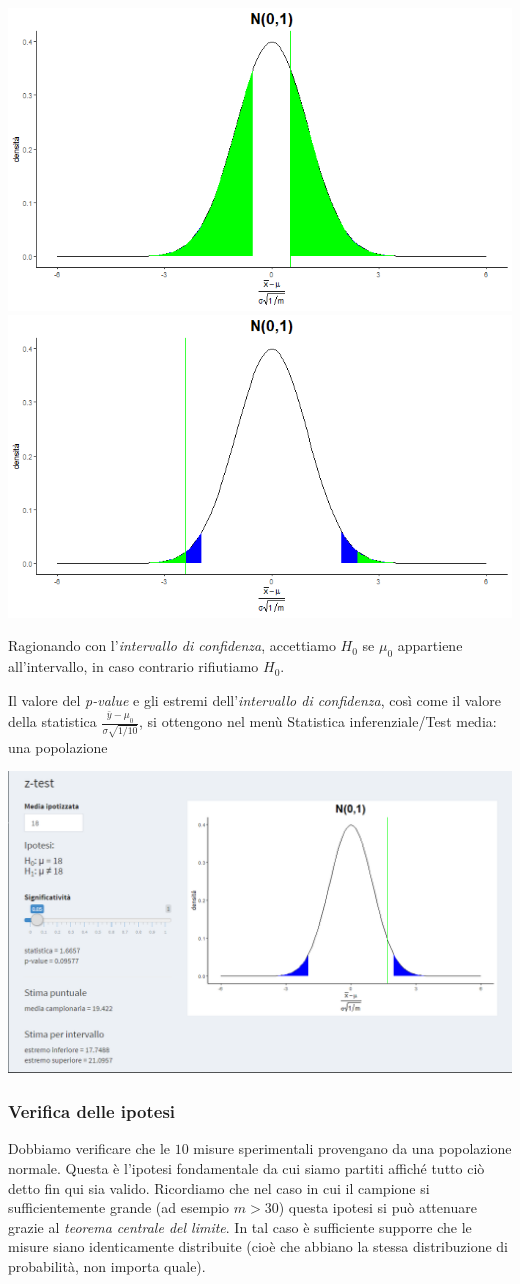 \documentclass[
  11pt,
]{book}
\begin{document}
\includegraphics[width=0.5\linewidth]{Immagini/Inferenziale/pval}
\includegraphics[width=0.5\linewidth]{Immagini/Inferenziale/pval1}

Ragionando con l'\emph{intervallo di confidenza}, accettiamo \(H_0\) se \(\mu_0\) appartiene all'intervallo, in caso contrario rifiutiamo \(H_0\).

Il valore del \emph{p-value} e gli estremi dell'\emph{intervallo di confidenza}, così come il valore della statistica \(\frac{\bar{y}-\mu_0}{\sigma\sqrt{1/10}}\), si ottengono nel menù Statistica inferenziale/Test media: una popolazione

\begin{center}\includegraphics[width=0.5\linewidth]{Immagini/Inferenziale/test_ip4} \end{center}

\hypertarget{verifica-delle-ipotesi}{%
\subsubsection{Verifica delle ipotesi}\label{verifica-delle-ipotesi}}

Dobbiamo verificare che le \(10\) misure sperimentali provengano da una popolazione normale. Questa è l'ipotesi fondamentale da cui siamo partiti affiché tutto ciò detto fin qui sia valido. Ricordiamo che nel caso in cui il campione si sufficientemente grande (ad esempio \(m>30\)) questa ipotesi si può attenuare grazie al \emph{teorema centrale del limite}. In tal caso è sufficiente supporre che le misure siano identicamente distribuite (cioè che abbiano la stessa distribuzione di probabilità, non importa quale).
\end{document}
